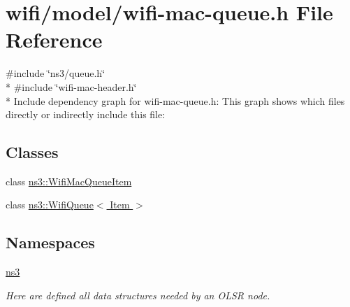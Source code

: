 \hypertarget{wifi-mac-queue_8h}{}\section{wifi/model/wifi-\/mac-\/queue.h File Reference}
\label{wifi-mac-queue_8h}
{\ttfamily \#include \char`\"{}ns3/queue.\+h\char`\"{}}\\*
{\ttfamily \#include \char`\"{}wifi-\/mac-\/header.\+h\char`\"{}}\\*
Include dependency graph for wifi-\/mac-\/queue.h\+:
This graph shows which files directly or indirectly include this file\+:
\subsection*{Classes}
\begin{DoxyCompactItemize}
\item 
class \hyperlink{classns3_1_1WifiMacQueueItem}{ns3\+::\+Wifi\+Mac\+Queue\+Item}
\item 
class \hyperlink{classns3_1_1WifiQueue}{ns3\+::\+Wifi\+Queue$<$ Item $>$}
\end{DoxyCompactItemize}
\subsection*{Namespaces}
\begin{DoxyCompactItemize}
\item 
 \hyperlink{namespacens3}{ns3}
\begin{DoxyCompactList}\small\item\em Here are defined all data structures needed by an O\+L\+SR node. \end{DoxyCompactList}\end{DoxyCompactItemize}
